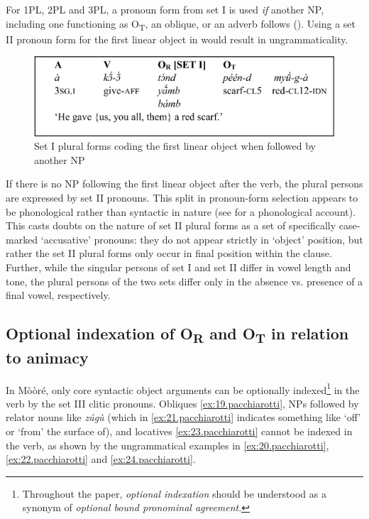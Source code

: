 \documentclass[output=paper]{langsci/langscibook}
\begin{document}
For 1PL, 2PL and 3PL, a pronoun form from set I is used \textit{if} another NP, including one functioning as O\textsubscript{T}, an oblique, or an adverb follows (). Using a set II pronoun form for the first linear object in  would result in ungrammaticality.

\begin{figure}[h]
\includegraphics[width=\textwidth]{figures/pacchiarottifig2}
\caption{Set I plural forms coding the first linear object when followed by another NP}
\label{fig:2.pacchiarotti}
\end{figure}

If there is no NP following the first linear object after the verb, the plural persons are expressed by set II pronouns. This split in pronoun-form selection appears to be phonological rather than syntactic in nature (see \citealt{peterson1971} for a phonological account). This casts doubts on the nature of set II plural forms as a set of specifically case-marked `accusative' pronouns: they do not appear strictly in `object' position, but rather the set II plural forms only occur in final position within the clause. Further, while the singular persons of set I and set II differ in vowel length and tone, the plural persons of the two sets differ only in the absence vs. presence of a final vowel, respectively. 

\subsection{Optional indexation of O\textsubscript{R} and O\textsubscript{T} in relation to animacy}\label{§4.4:optional.pacchiarotti}

In M\`{o}\`{o}r\'{e}, only core syntactic object arguments can be optionally indexed\footnote{Throughout the paper, \textit{optional indexation} should be understood as a synonym of \textit{optional bound pronominal agreement}.} in the verb by the set III clitic pronouns. Obliques \ref{ex:19.pacchiarotti}, NPs followed by relator nouns like \emph{z\'{u}g\`{u}} (which in \ref{ex:21.pacchiarotti} indicates something like `off' or `from' the surface of), and locatives \ref{ex:23.pacchiarotti} cannot be indexed in the verb, as shown by the ungrammatical examples in \ref{ex:20.pacchiarotti}, \ref{ex:22.pacchiarotti} and \ref{ex:24.pacchiarotti}. 
\end{document}
